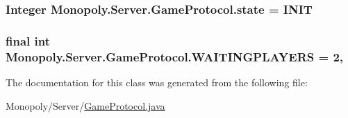 \subsubsection[{\texorpdfstring{state}{state}}]{\setlength{\rightskip}{0pt plus 5cm}Integer Monopoly.\+Server.\+Game\+Protocol.\+state = {\bf I\+N\+IT}\hspace{0.3cm}{\ttfamily [private]}}\hypertarget{class_monopoly_1_1_server_1_1_game_protocol_ad96dd410c80756d63c446a70222dec2d}{}\label{class_monopoly_1_1_server_1_1_game_protocol_ad96dd410c80756d63c446a70222dec2d}
\subsubsection[{\texorpdfstring{W\+A\+I\+T\+I\+N\+G\+P\+L\+A\+Y\+E\+RS}{WAITINGPLAYERS}}]{\setlength{\rightskip}{0pt plus 5cm}final int Monopoly.\+Server.\+Game\+Protocol.\+W\+A\+I\+T\+I\+N\+G\+P\+L\+A\+Y\+E\+RS = 2\hspace{0.3cm}{\ttfamily [static]}, {\ttfamily [private]}}\hypertarget{class_monopoly_1_1_server_1_1_game_protocol_aaefb144ef04b6626e85327e05d61e3b5}{}\label{class_monopoly_1_1_server_1_1_game_protocol_aaefb144ef04b6626e85327e05d61e3b5}


The documentation for this class was generated from the following file\+:\begin{DoxyCompactItemize}
\item 
Monopoly/\+Server/\hyperlink{_game_protocol_8java}{Game\+Protocol.\+java}\end{DoxyCompactItemize}
